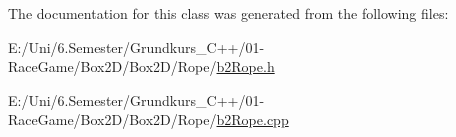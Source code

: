 The documentation for this class was generated from the following files\+:\begin{DoxyCompactItemize}
\item 
E\+:/\+Uni/6.\+Semester/\+Grundkurs\+\_\+\+C++/01-\/\+Race\+Game/\+Box2\+D/\+Box2\+D/\+Rope/\mbox{\hyperlink{b2_rope_8h}{b2\+Rope.\+h}}\item 
E\+:/\+Uni/6.\+Semester/\+Grundkurs\+\_\+\+C++/01-\/\+Race\+Game/\+Box2\+D/\+Box2\+D/\+Rope/\mbox{\hyperlink{b2_rope_8cpp}{b2\+Rope.\+cpp}}\end{DoxyCompactItemize}
